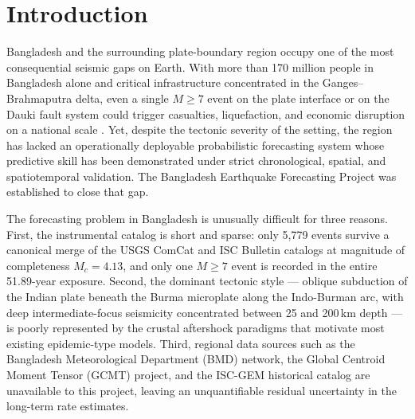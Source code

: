 \documentclass[10pt,a4paper,twocolumn]{article}
\begin{document}
\onecolumn
\tableofcontents
\vspace{0.5em}
\listoffigures
\vspace{0.5em}
\listoftables
\vspace{1.0em}
\twocolumn

\section{Introduction}\label{sec:intro}

Bangladesh and the surrounding plate-boundary region occupy one of the most consequential seismic gaps on Earth. With more than 170 million people in Bangladesh alone and critical infrastructure concentrated in the Ganges--Brahmaputra delta, even a single $M\geq7$ event on the plate interface or on the Dauki fault system could trigger casualties, liquefaction, and economic disruption on a national scale \cite{steckler2008, wang2013}. Yet, despite the tectonic severity of the setting, the region has lacked an operationally deployable probabilistic forecasting system whose predictive skill has been demonstrated under strict chronological, spatial, and spatiotemporal validation. The Bangladesh Earthquake Forecasting Project was established to close that gap.

The forecasting problem in Bangladesh is unusually difficult for three reasons. First, the instrumental catalog is short and sparse: only 5{,}779 events survive a canonical merge of the USGS ComCat and ISC Bulletin catalogs at magnitude of completeness $M_c=4.13$, and only one $M\geq7$ event is recorded in the entire 51.89-year exposure. Second, the dominant tectonic style --- oblique subduction of the Indian plate beneath the Burma microplate along the Indo-Burman arc, with deep intermediate-focus seismicity concentrated between 25 and 200\,km depth --- is poorly represented by the crustal aftershock paradigms that motivate most existing epidemic-type models. Third, regional data sources such as the Bangladesh Meteorological Department (BMD) network, the Global Centroid Moment Tensor (GCMT) project, and the ISC-GEM historical catalog are unavailable to this project, leaving an unquantifiable residual uncertainty in the long-term rate estimates.
\end{document}
